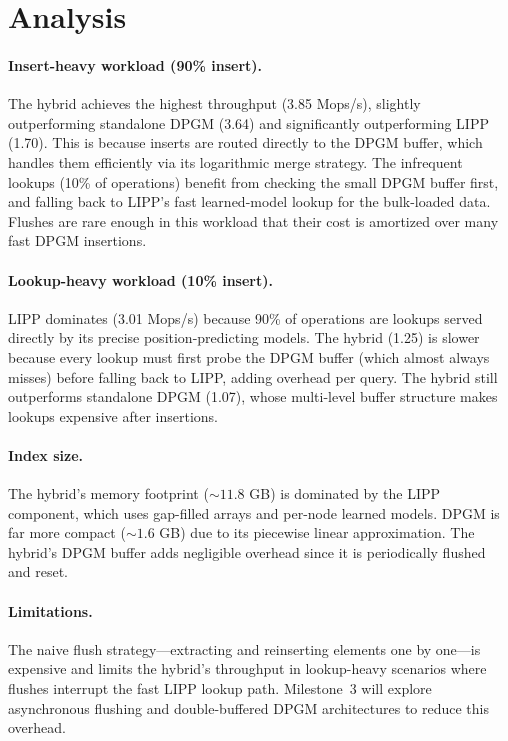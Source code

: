 \documentclass[11pt]{article}
\begin{document}
\section{Analysis}

\paragraph{Insert-heavy workload (90\% insert).}
The hybrid achieves the highest throughput (3.85 Mops/s), slightly outperforming standalone DPGM (3.64) and significantly outperforming LIPP (1.70). This is because inserts are routed directly to the DPGM buffer, which handles them efficiently via its logarithmic merge strategy. The infrequent lookups (10\% of operations) benefit from checking the small DPGM buffer first, and falling back to LIPP's fast learned-model lookup for the bulk-loaded data. Flushes are rare enough in this workload that their cost is amortized over many fast DPGM insertions.

\paragraph{Lookup-heavy workload (10\% insert).}
LIPP dominates (3.01 Mops/s) because 90\% of operations are lookups served directly by its precise position-predicting models. The hybrid (1.25) is slower because every lookup must first probe the DPGM buffer (which almost always misses) before falling back to LIPP, adding overhead per query. The hybrid still outperforms standalone DPGM (1.07), whose multi-level buffer structure makes lookups expensive after insertions.

\paragraph{Index size.}
The hybrid's memory footprint (${\sim}11.8$ GB) is dominated by the LIPP component, which uses gap-filled arrays and per-node learned models. DPGM is far more compact (${\sim}1.6$ GB) due to its piecewise linear approximation. The hybrid's DPGM buffer adds negligible overhead since it is periodically flushed and reset.

\paragraph{Limitations.}
The naive flush strategy---extracting and reinserting elements one by one---is expensive and limits the hybrid's throughput in lookup-heavy scenarios where flushes interrupt the fast LIPP lookup path. Milestone~3 will explore asynchronous flushing and double-buffered DPGM architectures to reduce this overhead.
\end{document}
